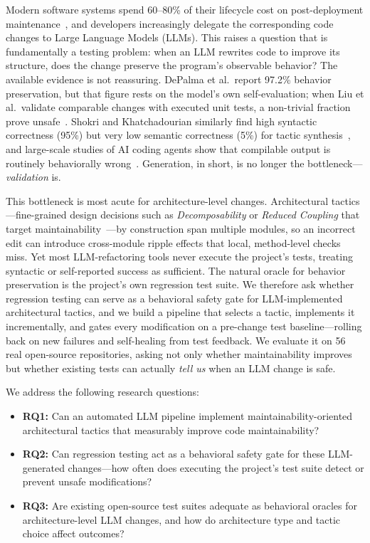 \documentclass[runningheads]{llncs}
\begin{document}
Modern software systems spend 60--80\% of their lifecycle cost on post-deployment maintenance~\cite{bass2021software}, and developers increasingly delegate the corresponding code changes to Large Language Models (LLMs). This raises a question that is fundamentally a testing problem: when an LLM rewrites code to improve its structure, does the change preserve the program's observable behavior? The available evidence is not reassuring. DePalma et al.\ report 97.2\% behavior preservation, but that figure rests on the model's own self-evaluation; when Liu et al.\ validate comparable changes with executed unit tests, a non-trivial fraction prove unsafe~\cite{depalma2024exploring,liu2025exploring}. Shokri and Khatchadourian similarly find high syntactic correctness (95\%) but very low semantic correctness (5\%) for tactic synthesis~\cite{shokri2024ipsynth}, and large-scale studies of AI coding agents show that compilable output is routinely behaviorally wrong~\cite{horikawa2025agentic}. Generation, in short, is no longer the bottleneck---\emph{validation} is.

This bottleneck is most acute for architecture-level changes. Architectural tactics---fine-grained design decisions such as \emph{Decomposability} or \emph{Reduced Coupling} that target maintainability~\cite{bass2021software,marquez2022architectural}---by construction span multiple modules, so an incorrect edit can introduce cross-module ripple effects that local, method-level checks miss. Yet most LLM-refactoring tools never execute the project's tests, treating syntactic or self-reported success as sufficient. The natural oracle for behavior preservation is the project's own regression test suite. We therefore ask whether regression testing can serve as a behavioral safety gate for LLM-implemented architectural tactics, and we build a pipeline that selects a tactic, implements it incrementally, and gates every modification on a pre-change test baseline---rolling back on new failures and self-healing from test feedback. We evaluate it on 56 real open-source repositories, asking not only whether maintainability improves but whether existing tests can actually \emph{tell us} when an LLM change is safe.

We address the following research questions:
\begin{itemize}[nosep]
    \item \textbf{RQ1:} Can an automated LLM pipeline implement maintainability-oriented architectural tactics that measurably improve code maintainability?
    \item \textbf{RQ2:} Can regression testing act as a behavioral safety gate for these LLM-generated changes---how often does executing the project's test suite detect or prevent unsafe modifications?
    \item \textbf{RQ3:} Are existing open-source test suites adequate as behavioral oracles for architecture-level LLM changes, and how do architecture type and tactic choice affect outcomes?
\end{itemize}
\end{document}
